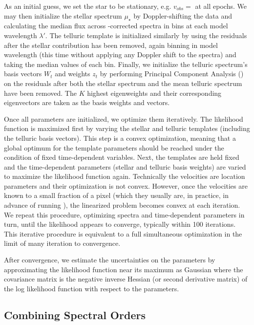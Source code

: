 \documentclass[modern]{aastex62}
\begin{document}
As an initial guess, we set the star to be stationary, e.g. $v_{obs} = $ \BERV at all epochs. 
We may then initialize the stellar spectrum $\mu_{\star}$ by Doppler-shifting the data and calculating the median flux across \BERV-corrected spectra in bins at each model wavelength $\lambda'$. 
The telluric template is initialized similarly by using the residuals after the stellar contribution has been removed, again binning in model wavelength (this time without applying any Doppler shift to the spectra) and taking the median values of each bin. 
Finally, we initialize the telluric spectrum's basis vectors $W_t$ and weights $z_t$ by performing Principal Component Analysis () on the residuals after both the stellar spectrum and the mean telluric spectrum have been removed. 
The $K$ highest eigenweights and their corresponding eigenvectors are taken as the basis weights and vectors. 

Once all parameters are initialized, we optimize them iteratively. 
The likelihood function is maximized first by varying the stellar and telluric templates (including the telluric basis vectors). 
This step is a convex optimization, meaning that a global optimum for the template parameters should be reached under the condition of fixed time-dependent variables. 
Next, the templates are held fixed and the time-dependent parameters (stellar \RVs and telluric basis weights) are varied to maximize the likelihood function again. 
Technically the velocities are location parameters and their optimization is not convex.
However, once the velocities are known to a small fraction of a pixel (which they usually are, in practice, in advance of running \wobble), the linearized problem becomes convex at each iteration.
We repeat this procedure, optimizing spectra and time-dependent parameters in turn, until the likelihood appears to converge, typically within 100 iterations.
This iterative procedure is equivalent to a full simultaneous optimization in the limit of many iteration to convergence.

After convergence, we estimate the uncertainties on the parameters by
approximating the likelihood function near its maximum as Gaussian where the
covariance matrix is the negative inverse Hessian (or second derivative
matrix) of the log likelihood function with respect to the parameters.

\subsection{Combining Spectral Orders}
\label{s:combining-orders}
\end{document}
